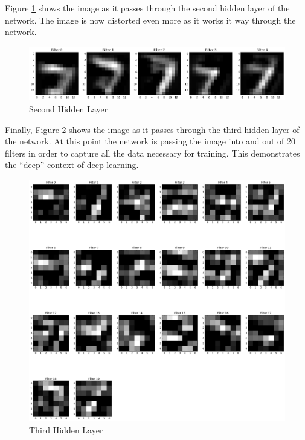 \documentclass[conference,final,]{IEEEtran}
\begin{document}
Figure \ref{fig:hl2} shows the image as it passes through the second
hidden layer of the network. The image is now distorted even more as it
works it way through the network.\\

\begin{figure}
  \includegraphics[width=\linewidth]{../images/hl2.png}
  \caption{Second Hidden Layer}
  \label{fig:hl2}
\end{figure}

Finally, Figure \ref{fig:hl3} shows the image as it passes through the
third hidden layer of the network. At this point the network is passing
the image into and out of 20 filters in order to capture all the data
necessary for training. This demonstrates the ``deep'' context of deep
learning.\\

\begin{figure}
  \includegraphics[width=\linewidth]{../images/hl3.png}
  \caption{Third Hidden Layer}
  \label{fig:hl3}
\end{figure}
\end{document}
